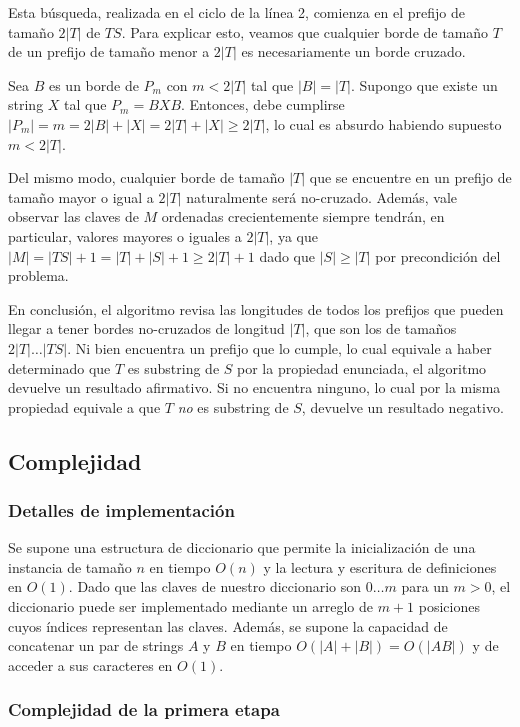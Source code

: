 Esta búsqueda, realizada en el ciclo de la línea 2, comienza en el prefijo de tamaño $2|T|$ de $TS$. Para explicar esto, veamos que cualquier borde de tamaño $T$ de un prefijo de tamaño menor a $2|T|$ es necesariamente un borde cruzado.

Sea $B$ es un borde de $P_m$ con $m < 2|T|$ tal que $|B| = |T|$. Supongo que existe un string $X$ tal que $P_m = BXB$. Entonces, debe cumplirse $|P_m| = m = 2|B|+|X| = 2|T| + |X| \geq 2|T|$, lo cual es absurdo habiendo supuesto $m < 2|T|$.

Del mismo modo, cualquier borde de tamaño $|T|$ que se encuentre en un prefijo de tamaño mayor o igual a $2|T|$ naturalmente será no-cruzado. Además, vale observar las claves de $M$ ordenadas crecientemente siempre tendrán, en particular, valores mayores o iguales a $2|T|$, ya que $|M| = |TS|+1 = |T|+|S|+1 \geq 2|T| + 1$ dado que $|S| \geq |T|$ por precondición del problema.

En conclusión, el algoritmo revisa las longitudes de todos los prefijos que pueden llegar a tener bordes no-cruzados de longitud $|T|$, que son los de tamaños $2|T| \dots |TS|$. Ni bien encuentra un prefijo que lo cumple, lo cual equivale a haber determinado que $T$ es substring de $S$ por la propiedad enunciada, el algoritmo devuelve un resultado afirmativo. Si no encuentra ninguno, lo cual por la misma propiedad equivale a que $T$ \textit{no} es substring de $S$, devuelve un resultado negativo.
 
\subsection{Complejidad}

\subsubsection{Detalles de implementación}

Se supone una estructura de diccionario que permite la inicialización de una instancia de tamaño $n$ en tiempo $O(n)$ y la lectura y escritura de definiciones en $O(1)$. Dado que las claves de nuestro diccionario son $0 \dots m$ para un $m > 0$, el diccionario puede ser implementado mediante un arreglo de $m+1$ posiciones cuyos índices representan las claves. Además, se supone la capacidad de concatenar un par de strings $A$ y $B$ en tiempo $O(|A|+|B|) = O(|AB|)$ y de acceder a sus caracteres en $O(1)$.

\subsubsection{Complejidad de la primera etapa}

